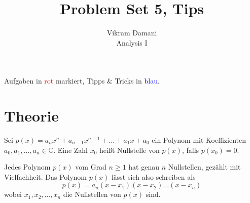\documentclass[12pt]{article}
\newcommand{\C}{\mathbb{C}}
\newenvironment{definition}[2][Definition]{\begin{trivlist}
        \item[\hskip \labelsep {\bfseries #1}\hskip \labelsep {\bfseries #2.}]}{\flushright{$\square$}\end{trivlist}}
\begin{document}
\title{Problem Set 5, Tips}
\author{Vikram Damani\\
    Analysis I}

\maketitle
Aufgaben in \textcolor{red}{rot} markiert, Tipps \& Tricks in \textcolor{blue}{blau}.

\section{Theorie}

\begin{definition}{[Fundamentalsatz der Algebra]}
    Sei $p(x)=a_nx^n+a_{n-1}x^{n-1}+\ldots+a_1x+a_0$ ein Polynom mit Koeffizienten $a_0,a_1,\ldots,a_n\in\C$. Eine Zahl $x_0$ heißt Nullstelle von $p(x)$, falls $p(x_0)=0$.

    Jedes Polynom $p(x)$ vom Grad $n\geq 1$ hat genau $n$ Nullstellen, gezählt mit Vielfachheit. Das Polynom $p(x)$ lässt sich also schreiben als
    \begin{equation}
        p(x)=a_n(x-x_1)(x-x_2)\ldots(x-x_n)
    \end{equation}
    wobei $x_1,x_2,...,x_n$ die Nullstellen von $p(x)$ sind.
\end{definition}
\end{document}
